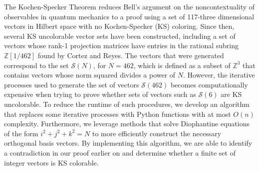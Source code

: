 \documentclass[11pt]{article}
\begin{document}
\pagestyle{fancy}

\lfoot{} 
\rfoot{}
	The Kochen-Specker Theorem reduces Bell’s argument on the noncontextuality of observables in quantum mechanics to a proof using a set of 117-three dimensional vectors in Hilbert space with no Kochen-Specker (KS) coloring. Since then, several KS uncolorable vector sets have been constructed, including a set of vectors whose rank-1 projection matrices have entries in the rational subring $\mathbb{Z}[1/462]$ found by Cortez and Reyes. The vectors that were generated correspond to the set $\mathcal{S}(N)$, for $N = 462$, which is defined as a subset of $\mathbb{Z}^{3}$ that contains vectors whose norm squared divides a power of $N$. However, the iterative processes used to generate the set of vectors $\mathcal{S}(462)$ becomes computationally expensive when trying to prove whether sets of vectors such as $\mathcal{S}(6)$ are KS uncolorable. To reduce the runtime of such procedures, we develop an algorithm that replaces some iterative processes with Python functions with at most $O(n)$ complexity. Furthermore, we leverage methods that solve Diophantine equations of the form $i^{2} + j^{2} + k^{2} = N$ to more efficiently construct the necessary orthogonal basis vectors. By implementing this algorithm, we are able to identify a contradiction in our proof earlier on and determine whether a finite set of integer vectors is KS colorable.
\end{document}
